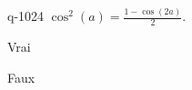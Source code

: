\begin{truefalse}{q-1024}
$\cos^2(a)=\frac{1-\cos(2a)}{2}$.
\item Vrai
\item* Faux
\end{truefalse}

